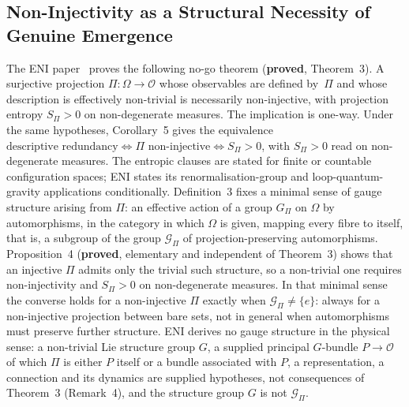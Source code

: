 \documentclass[11pt,a4paper]{article}
\newcommand{\sproved}{\textcolor{cproved}{\textbf{proved}}}
\begin{document}
  \subsection{Non-Injectivity as a Structural Necessity of Genuine Emergence}

    The ENI paper~\cite{Beau2026l} proves the following no-go theorem (\sproved, Theorem~3).
    A surjective projection $\Pi : \Omega \to \mathcal{O}$ whose observables are defined by~$\Pi$ and whose
    description is effectively non-trivial is necessarily non-injective, with projection entropy $S_\Pi > 0$ on
    non-degenerate measures.
    The implication is one-way.
    Under the same hypotheses, Corollary~5 gives the equivalence
    $\text{descriptive redundancy} \Leftrightarrow \Pi \text{ non-injective} \Leftrightarrow S_\Pi > 0$,
    with $S_\Pi > 0$ read on non-degenerate measures.
    The entropic clauses are stated for finite or countable configuration spaces; ENI states its
    renormalisation-group and loop-quantum-gravity applications conditionally.
    Definition~3 fixes a minimal sense of gauge structure arising from $\Pi$: an effective action of a group
    $G_\Pi$ on $\Omega$ by automorphisms, in the category in which $\Omega$ is given, mapping every fibre to
    itself, that is, a subgroup of the group $\mathcal{G}_\Pi$ of projection-preserving automorphisms.
    Proposition~4 (\sproved, elementary and independent of Theorem~3) shows that an injective $\Pi$ admits only
    the trivial such structure, so a non-trivial one requires non-injectivity and $S_\Pi > 0$ on non-degenerate
    measures.
    In that minimal sense the converse holds for a non-injective $\Pi$ exactly when $\mathcal{G}_\Pi \neq \{e\}$:
    always for a non-injective projection between bare sets, not in general when automorphisms must preserve
    further structure.
    ENI derives no gauge structure in the physical sense: a non-trivial Lie structure group $G$, a supplied
    principal $G$-bundle $P \to \mathcal{O}$ of which $\Pi$ is either $P$ itself or a bundle associated with $P$, a
    representation, a connection and its dynamics are supplied hypotheses, not consequences of Theorem~3
    (Remark~4), and the structure group $G$ is not $\mathcal{G}_\Pi$.
\end{document}
